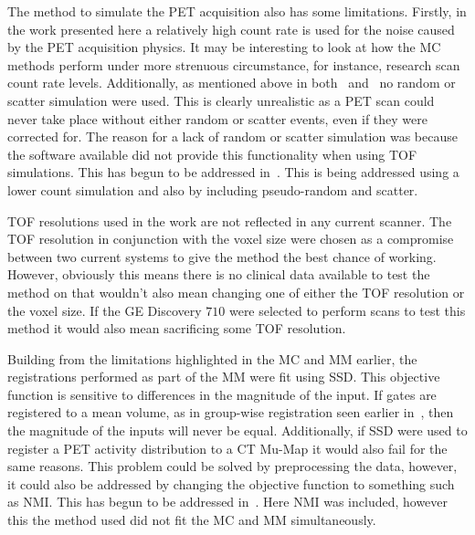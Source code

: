         The method to simulate the \gls{PET} acquisition also has some limitations. Firstly, in the work presented here a relatively high count rate is used for the noise caused by the \gls{PET} acquisition physics. It may be interesting to look at how the \gls{MC} methods perform under more strenuous circumstance, for instance, research scan count rate levels. Additionally, as mentioned above in both~ and~ no random or scatter simulation were used. This is clearly unrealistic as a \gls{PET} scan could never take place without either random or scatter events, even if they were corrected for. The reason for a lack of random or scatter simulation was because the software available did not provide this functionality when using \gls{TOF} simulations. This has begun to be addressed in~. This is being addressed using a lower count simulation and also by including pseudo-random and scatter.
        
        \gls{TOF} resolutions used in the work are not reflected in any current scanner. The \gls{TOF} resolution in conjunction with the voxel size were chosen as a compromise between two current systems to give the method the best chance of working. However, obviously this means there is no clinical data available to test the method on that wouldn't also mean changing one of either the \gls{TOF} resolution or the voxel size. If the \gls{GE} Discovery $710$ were selected to perform scans to test this method it would also mean sacrificing some \gls{TOF} resolution.
        
        Building from the limitations highlighted in the \gls{MC} and \gls{MM} earlier, the registrations performed as part of the \gls{MM} were fit using \gls{SSD}. This objective function is sensitive to differences in the magnitude of the input. If gates are registered to a mean volume, as in group-wise registration seen earlier in~, then the magnitude of the inputs will never be equal. Additionally, if \gls{SSD} were used to register a \gls{PET} activity distribution to a \gls{CT} \gls{Mu-Map} it would also fail for the same reasons. This problem could be solved by preprocessing the data, however, it could also be addressed by changing the objective function to something such as \gls{NMI}. This has begun to be addressed in~. Here \gls{NMI} was included, however this the method used did not fit the \gls{MC} and \gls{MM} simultaneously.
        
